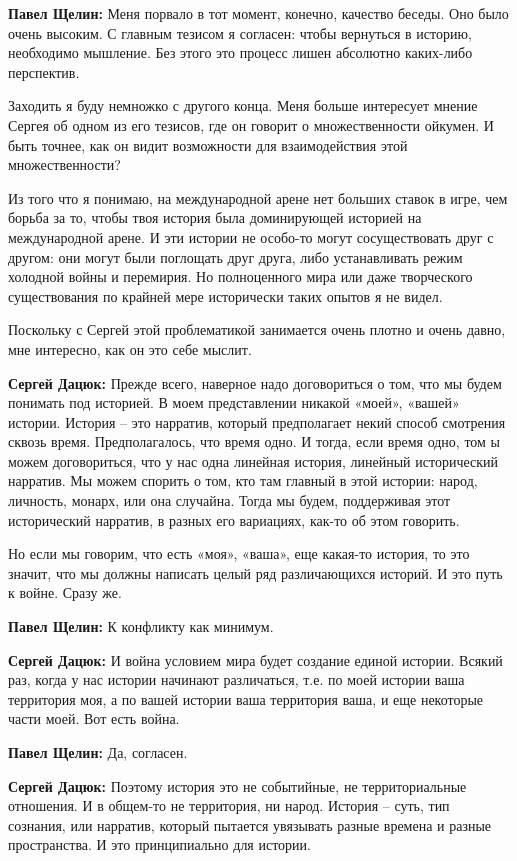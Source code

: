 \textbf{Павел Щелин:} Меня порвало в тот момент, конечно, качество беседы. Оно было
очень высоким. С главным тезисом я согласен: чтобы вернуться в историю,
необходимо мышление. Без этого это процесс лишен абсолютно каких-либо
перспектив.

Заходить я буду немножко с другого конца. Меня больше интересует мнение Сергея
об одном из его тезисов, где он говорит о множественности ойкумен. И быть
точнее, как он видит возможности для взаимодействия этой множественности?


Из того что я понимаю, на международной арене нет больших ставок в игре, чем
борьба за то, чтобы твоя история была доминирующей историей на международной
арене. И эти истории не особо-то могут сосуществовать друг с другом: они могут
были поглощать друг друга, либо устанавливать режим холодной войны и перемирия.
Но полноценного мира или даже творческого существования по крайней мере
исторически таких опытов я не видел.

Поскольку с Сергей этой проблематикой занимается очень плотно и очень давно,
мне интересно, как он это себе мыслит.

\textbf{Сергей Дацюк:} Прежде всего, наверное надо договориться о том, что мы будем
понимать под историей. В моем представлении никакой «моей», «вашей» истории.
История – это нарратив, который предполагает некий способ смотрения сквозь
время. Предполагалось, что время одно. И тогда, если время одно, том ы можем
договориться, что у нас одна линейная история, линейный исторический нарратив.
Мы можем спорить о том, кто там главный в этой истории: народ, личность,
монарх, или она случайна. Тогда мы будем, поддерживая этот исторический
нарратив, в разных его вариациях, как-то об этом говорить.

Но если мы говорим, что есть «моя», «ваша», еще какая-то история, то это
значит, что мы должны написать целый ряд различающихся историй. И это путь к
войне. Сразу же.

\textbf{Павел Щелин:} К конфликту как минимум.

\textbf{Сергей Дацюк:} И война условием мира будет создание единой истории. Всякий раз,
когда у нас истории начинают различаться, т.е. по моей истории ваша территория
моя, а по вашей истории ваша территория ваша, и еще некоторые части моей. Вот
есть война.

\textbf{Павел Щелин:} Да, согласен.

\textbf{Сергей Дацюк:} Поэтому история это не событийные, не территориальные отношения.
И в общем-то не территория, ни народ. История – суть, тип сознания, или
нарратив, который пытается увязывать разные времена и разные пространства. И
это принципиально для истории.

